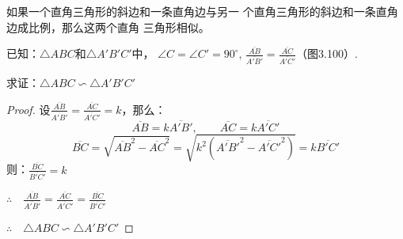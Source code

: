 \begin{example}
    如果一个直角三角形的斜边和一条直角边与另一
个直角三角形的斜边和一条直角边成比例，那么这两个直角
三角形相似。

已知：$\triangle ABC$和$\triangle A'B'C'$中，
$\angle C=\angle C'=90^{\circ}$, $\frac{\overline{AB}}{\overline{A'B'}}=\frac{\overline{AC}}{\overline{A'C'}}$（图3.100）.

求证：$\triangle ABC\backsim \triangle A'B'C'$
\end{example}

\begin{proof}
设$\frac{\overline{AB}}{\overline{A'B'}}=\frac{\overline{AC}}{\overline{A'C'}}=k$，那么：
\[\overline{AB}=k\overline{A'B'},\qquad \overline{AC}=k\overline{A'C'}\]
\[\overline{BC}=\sqrt{\overline{AB}^2-\overline{AC}^2}=\sqrt{k^2\left(\overline{A'B'}^2-\overline{A'C'}^2\right)}=k\overline{B'C'}\]
则：$\frac{\overline{BC}}{\overline{B'C'}}=k$

$\therefore\quad \frac{\overline{AB}}{\overline{A'B'}}=\frac{\overline{AC}}{\overline{A'C'}}=\frac{\overline{BC}}{\overline{B'C'}}$

$\therefore\quad \triangle ABC\backsim \triangle A'B'C'$
\end{proof}

